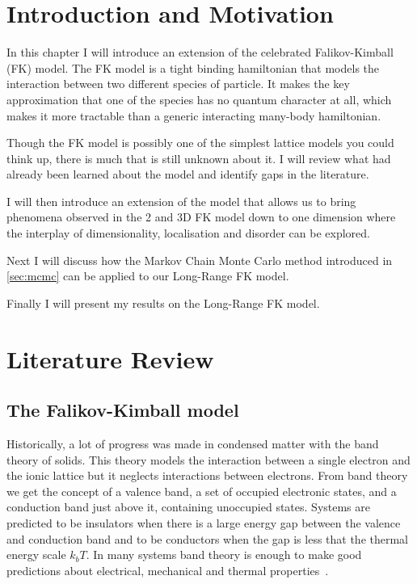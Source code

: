 \section{Introduction and Motivation}
In this chapter I will introduce an extension of the celebrated Falikov-Kimball (FK) model. The FK model is a tight binding hamiltonian that models the interaction between two different species of particle. It makes the key approximation that one of the species has no quantum character at all, which makes it more tractable than a generic interacting many-body hamiltonian.

Though the FK model is possibly one of the simplest lattice models you could think up, there is much that is still unknown about it. I will review what had already been learned about the model and identify gaps in the literature.

I will then introduce an extension of the model that allows us to bring phenomena observed in the 2 and 3D FK model down to one dimension where the interplay of dimensionality, localisation and disorder can be explored.

Next I will discuss how the Markov Chain Monte Carlo method introduced in \autoref{sec:mcmc} can be applied to our Long-Range FK model.

Finally I will present my results on the Long-Range FK model.
		
\section{Literature Review}

\subsection{The Falikov-Kimball model}

Historically, a lot of progress was made in condensed matter with the band theory of solids. This theory models the interaction between a single electron and the ionic lattice but it neglects interactions between electrons. From band theory we get the concept of a valence band, a set of occupied electronic states, and a conduction band just above it, containing unoccupied states. Systems are predicted to be insulators when there is a large energy gap between the valence and conduction band and to be conductors when the gap is less that the thermal energy scale \(k_bT\). In many systems band theory is enough to make good predictions about electrical, mechanical and thermal properties~\cite{neilw.ashcroftSolidStatePhysics1976}. 


